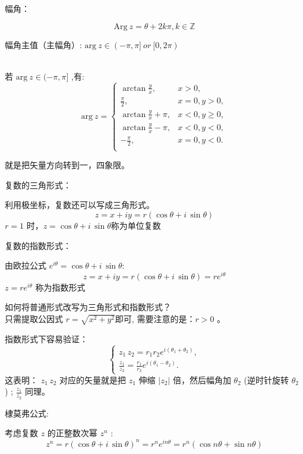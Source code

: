 \documentclass[cn,hazy,blue,14pt,normal]{elegantnote}
\numberwithin{equation}{section}
\begin{document}
\begin{definition}
	幅角：
\end{definition}
$$\text{Arg}\ z=\theta+2k\pi , k\in\mathbb{Z}$$

幅角主值（主幅角）:  $\text{arg}\ z \in (-\pi,\pi]\ or \ [0,2\pi)$\\​

若 $\text{arg}\ z \in (-\pi,\pi]$ ,有:
\begin{equation*}
    \text{arg}\ z=
\left \{
    \begin{array}{lr}
        \arctan\frac{y}{x},& x>0,\\ 
        \frac{\pi}{2},& x=0,y>0,\\
        \arctan\frac{y}{x}+\pi, & x<0,y\geqslant0,\\
        \arctan\frac{y}{x}-\pi, & x<0,y<0,\\
        -\frac{\pi}{2},& x=0,y<0.\\
    \end{array} 
\right.
\end{equation*}
\begin{note}
就是把矢量方向转到一，四象限。
\end{note}
\begin{definition}
	复数的三角形式：
\end{definition}
利用极坐标，复数还可以写成三角形式。
$$
z=x+iy=r(\cos\theta+i\,\sin\theta)
$$
$r=1$ 时，$z=\cos\theta+i\,\sin\theta$​ 称为单位复数
\begin{definition}
	复数的指数形式：
\end{definition}
由欧拉公式 $e^{i\theta}=\cos\theta+i\,\sin\theta$​​ :
$$
z=x+iy=r(\cos\theta+i\,\sin\theta)=re^{i\theta}
$$
$z=re^{i\theta}$ 称为指数形式
\begin{note}
	如何将普通形式改写为三角形式和指数形式？\\
	只需提取公因式 $r=\sqrt{x^2+y^2}$​ 即可, 需要注意的是：$r>0$ 。
\end{note}
指数形式下容易验证：
$$
\left \{
	\begin{array}{l}
		z_1\,z_2=r_1r_2e^{i(\theta_1+\theta_2)},\\
		\frac{z_1}{z_2}=\frac{r_1}{r_2}e^{i(\theta_1-\theta_2)}.
	\end{array}
\right .
$$
这表明：
$z_1\,z_2$ 对应的矢量就是把 $z_1$ 伸缩 $|z_2|$ 倍，然后幅角加 $\theta_2$ (逆时针旋转 $\theta_2$ ) ; $\frac{z_1}{z_2}$ 同理。
\begin{definition}
	棣莫弗公式:
\end{definition}
考虑复数 $z$ 的正整数次幂 $z^n$ :
\begin{equation}
	z^n=r(\cos\theta+i\,\sin\theta)^n=r^ne^{in\theta}=r^n(\cos n\theta+\sin n\theta)
\end{equation}
\end{document}
